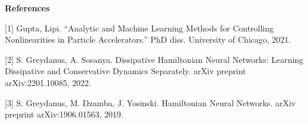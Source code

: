 \documentclass[11pt]{article}
\begin{document}
\medskip

{\bf References}

\smallskip

[1] Gupta, Lipi. “Analytic and Machine Learning Methods for Controlling Nonlinearities in Particle Accelerators.” PhD diss. University of Chicago, 2021.


\medskip

[2] S. Greydanus, A. Sosanya. Dissipative Hamiltonian Neural Networks: Learning Dissipative and Conservative Dynamics Separately. arXiv preprint arXiv:2201.10085, 2022.


\medskip

[3] S. Greydanus, M. Dzamba, J. Yosinski. Hamiltonian Neural Networks. arXiv preprint arXiv:1906.01563, 2019.
\end{document}
